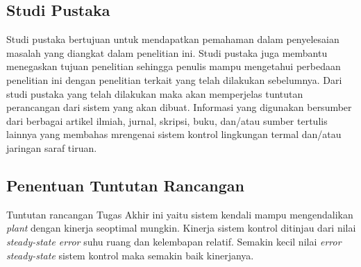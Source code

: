 

\subsection{Studi Pustaka}
Studi pustaka bertujuan untuk mendapatkan pemahaman dalam penyelesaian masalah yang diangkat dalam penelitian ini. Studi pustaka juga membantu menegaskan tujuan penelitian sehingga penulis mampu mengetahui perbedaan penelitian ini dengan penelitian terkait yang telah dilakukan sebelumnya. Dari studi pustaka yang telah dilakukan maka akan memperjelas tuntutan perancangan dari sistem yang akan dibuat. Informasi yang digunakan bersumber dari berbagai artikel ilmiah, jurnal, skripsi, buku, dan/atau sumber tertulis lainnya yang membahas mrengenai sistem kontrol lingkungan termal dan/atau jaringan saraf tiruan.

\subsection{Penentuan Tuntutan Rancangan}

Tuntutan rancangan Tugas Akhir ini yaitu sistem kendali mampu mengendalikan \textit{plant} dengan kinerja seoptimal mungkin. Kinerja sistem kontrol ditinjau dari nilai \textit{steady-state error} suhu ruang dan kelembapan relatif. Semakin kecil nilai \textit{error steady-state} sistem kontrol maka semakin baik kinerjanya.


